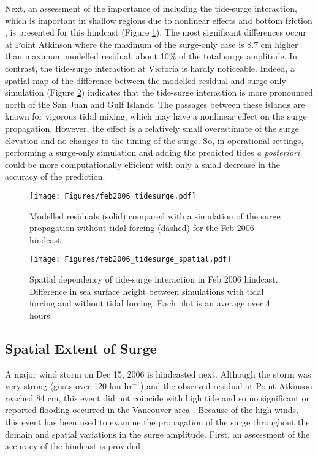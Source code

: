 \documentclass[letterpaper]{tATO2e}
\begin{document}
Next, an assessment of the importance of including the tide-surge interaction, which is important in shallow regions due to nonlinear effects and bottom friction \citep{bernier2007tide}, is presented for this hindcast (Figure \ref{fig:tidesurge}). The most significant differences occur at Point Atkinson where the maximum of the surge-only case is 8.7 cm higher than maximum modelled residual, about 10\% of the total surge amplitude.  In contrast, the tide-surge interaction at Victoria is hardly noticeable. Indeed, a spatial map of the difference between the modelled residual and surge-only simulation (Figure \ref{fig:tidesurge_spatial}) indicates that the tide-surge interaction is more pronounced north of the San Juan and Gulf Islands. The passages between these islands are known for vigorous tidal mixing, which may have a nonlinear effect on the surge propagation. However, the effect is a relatively small overestimate of the surge elevation and no changes to the timing of the surge. So, in operational settings, performing a surge-only simulation and adding the predicted tides \textit{a posteriori} could be more computationally efficient with only a small decrease in the accuracy of the prediction. 

\begin{figure}
\centering
\texttt{[image: Figures/feb2006\_tidesurge.pdf]}
\caption{Modelled residuals (solid) compared with a simulation of the surge propagation without tidal forcing (dashed) for the Feb 2006 hindcast. }
\label{fig:tidesurge}
\end{figure}

\begin{figure}
\centering
\texttt{[image: Figures/feb2006\_tidesurge\_spatial.pdf]}
\caption{Spatial dependency of tide-surge interaction in Feb 2006 hindcast. Difference in sea surface height between simulations with tidal forcing and without tidal forcing. Each plot is an average over 4 hours. }
\label{fig:tidesurge_spatial}
\end{figure}


\subsection{Spatial Extent of Surge}\label{sec:spatial}
A major wind storm on Dec 15, 2006 is hindcasted next. Although the storm was very strong (gusts over 120 km hr$^{-1}$) and the observed residual at Point Atkinson reached 84 cm, this event did not coincide with high tide and so no significant or reported flooding occurred in the Vancouver area \citep{forseth2006adaptation}. Because of the high winds, this event has been used to examine the propagation of the surge throughout the domain and spatial variations in the surge amplitude. First, an assessment of the accuracy of the hindcast is provided. 
\end{document}
